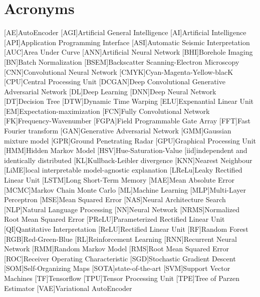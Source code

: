 \chapter{Acronyms}

\begin{acronym}[DCGANS]
[AE]{AutoEncoder}
[AGI]{Artificial General Intelligence}
[AI]{Artificial Intelligence}
[API]{Application Programming Interface}
[ASI]{Automatic Seismic Interpretation}
[AUC]{Area Under Curve}
[ANN]{Artificial Neural Network}
[BHI]{Borehole Imaging}
[BN]{Batch Normalization}
[BSEM]{Backscatter Scanning-Electron Microscopy}
[CNN]{Convolutional Neural Network}
[CMYK]{Cyan-Magenta-Yellow-blacK}
[CPU]{Central Processing Unit}
[DCGAN]{Deep Convolutional Generative Adversarial Network}
[DL]{Deep Learning}
[DNN]{Deep Neural Network}
[DT]{Decision Tree}
[DTW]{Dynamic Time Warping}
[ELU]{Expenantial Linear Unit}
[EM]{Expectation-maximization}
[FCN]{Fully Convolutional Network}
[FK]{Frequency-Wavenumber}
[FGPA]{Field Programmable Gate Array}
[FFT]{Fast Fourier transform}
[GAN]{Generative Adversarial Network}
[GMM]{Gaussian mixture model}
[GPR]{Ground Penetrating Radar}
[GPU]{Graphical Processing Unit}
[HMM]{Hidden Markov Model} 
[HSV]{Hue-Saturation-Value}
[iid]{independent and identically distributed}
[KL]{Kullback-Leibler divergence}
[KNN]{Nearest Neighbour}
[LiME]{local interpretable model-agnostic explanation}
[LReLu]{Leaky Rectified Linear Unit}
[LSTM]{Long Short-Term Memory}
[MAE]{Mean Absolute Error}
[MCMC]{Markov Chain Monte Carlo}
[ML]{Machine Learning}
[MLP]{Multi-Layer Perceptron}
[MSE]{Mean Squared Error}
[NAS]{Neural Architecture Search}
[NLP]{Natural Language Processing}
[NN]{Neural Network}
[NRMS]{Normalized Root Mean Squared Error}
[PReLU]{Parameterized Rectified Linear Unit}
[QI]{Qantitative Interpretation}
[ReLU]{Rectified Linear Unit}
[RF]{Random Forest}
[RGB]{Red-Green-Blue}
[RL]{Reinforcement Learning}
[RNN]{Recurrent Neural Network}
[RMM]{Random Markov Model}
[RMS]{Root Mean Squared Error}
[ROC]{Receiver Operating Characteristic}
[SGD]{Stochastic Gradient Descent}
[SOM]{Self-Organizing Maps}
[SOTA]{state-of-the-art}
[SVM]{Support Vector Machines}
[TF]{Tensorflow}
[TPU]{Tensor Processing Unit}
[TPE]{Tree of Parzen Estimator}
[VAE]{Variational AutoEncoder}
\end{acronym}

